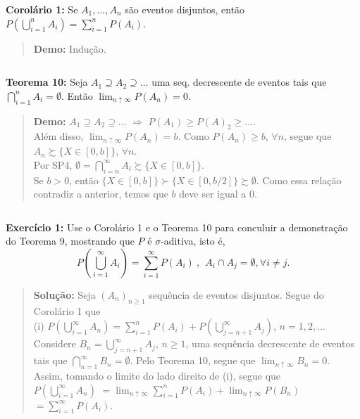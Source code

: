 \documentclass[
]{book}
\begin{document}
\(~\)

\textbf{Corolário 1:} Se \(A_1, \ldots, A_n\) são eventos disjuntos, então \(P\left(\bigcup_{i=1}^{n} A_i\right) = \sum_{i=1}^{n} P\left(A_i\right)\).

\begin{quote}
\textbf{Demo:} Indução.
\end{quote}

\(~\)

\textbf{Teorema 10:} Seja \(A_1 \supseteq A_2 \supseteq \ldots\) uma seq. decrescente de eventos tais que \(\bigcap_{i=1}^{n} A_i = \emptyset\). Então \(\displaystyle \lim_{n \uparrow \infty} P(A_n) = 0\).

\begin{quote}
\textbf{Demo:} \(A_1 \supseteq A_2 \supseteq \ldots\) \(\Rightarrow\) \(P(A_1) \geq P(A)_2 \geq \ldots\).\\
Além disso, \(\displaystyle \lim_{n \uparrow \infty} P(A_n) = b\). Como \(P(A_n) \geq b\), \(\forall n\), segue que \(A_n \succsim \{X \in [0,b]\}\), \(\forall n\).\\
Por SP4, \(\emptyset = \bigcap_{i=n}^{\infty} A_i \succsim \{X \in [0,b]\}\).\\
Se \(b>0\), então \(\{X \in [0,b]\} \succ \{X \in [0,b/2]\} \succsim \emptyset\). Como essa relação contradiz a anterior, temos que \(b\) deve ser igual a \(0\).
\end{quote}

\(~\)

\textbf{Exercício 1:}
Use o Corolário 1 e o Teorema 10 para conculuir a demonstração do Teorema 9, mostrando que \(P\) é \(\sigma\)-aditiva, isto é, \[P\left(\bigcup_{i=1}^{\infty} A_i\right) = \sum_{i=1}^{\infty} P\left(A_i\right) ~,~~ A_i \cap A_j = \emptyset, \forall i \neq j.\]

\begin{quote}
\textbf{Solução:} Seja \((A_n)_{n \geq 1}\) sequência de eventos disjuntos. Segue do Corolário 1 que\\
(i) \(\displaystyle P\left(\bigcup_{i=1}^{\infty} A_n\right) = \sum_{i=1}^{n} P\left(A_i\right) + P\left(\bigcup_{j=n+1}^{\infty} A_j\right)\), \(n=1,2,\ldots\)\\
Considere \(\displaystyle B_n=\bigcup_{j=n+1}^{\infty} A_j\), \(n \geq 1\), uma sequência decrescente de eventos tais que \(\displaystyle \bigcap_{n=1}^{\infty} B_n = \emptyset\). Pelo Teorema 10, segue que \(\displaystyle \lim_{n\uparrow \infty} B_n = 0\). Assim, tomando o limite do lado direito de (i), segue que\\
\(\displaystyle P\left(\bigcup_{i=1}^{\infty} A_n\right)\) \(=\displaystyle \lim_{n\uparrow \infty} \sum_{i=1}^{n} P\left(A_i\right) + \lim_{n\uparrow \infty} P\left(B_n\right)\) \(=\displaystyle \sum_{i=1}^{\infty} P\left(A_i\right)\).
\end{quote}
\end{document}
